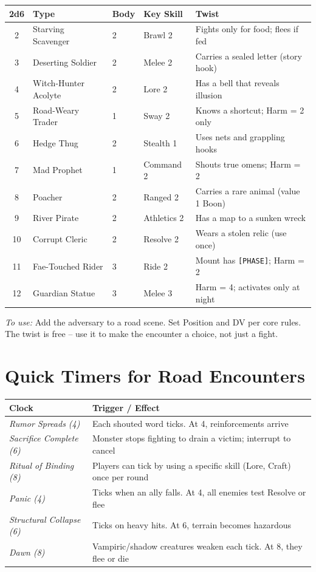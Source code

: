 \bigskip
\begin{tabular}{@{}cllll}
\toprule
2d6 & \textbf{Type} & \textbf{Body} & \textbf{Key Skill} & \textbf{Twist} \\
\midrule
2 & Starving Scavenger & 2 & Brawl 2 & Fights only for food; flees if fed \\
3 & Deserting Soldier & 2 & Melee 2 & Carries a sealed letter (story hook) \\
4 & Witch-Hunter Acolyte & 2 & Lore 2 & Has a bell that reveals illusion \\
5 & Road-Weary Trader & 1 & Sway 2 & Knows a shortcut; Harm = 2 only \\
6 & Hedge Thug & 2 & Stealth 1 & Uses nets and grappling hooks \\
7 & Mad Prophet & 1 & Command 2 & Shouts true omens; Harm = 2 \\
8 & Poacher & 2 & Ranged 2 & Carries a rare animal (value 1 Boon) \\
9 & River Pirate & 2 & Athletics 2 & Has a map to a sunken wreck \\
10 & Corrupt Cleric & 2 & Resolve 2 & Wears a stolen relic (use once) \\
11 & Fae-Touched Rider & 3 & Ride 2 & Mount has \texttt{[PHASE]}; Harm = 2 \\
12 & Guardian Statue & 3 & Melee 3 & Harm = 4; activates only at night \\
\bottomrule
\end{tabular}

\noindent \emph{To use:} Add the adversary to a road scene. Set Position and DV per core rules. The twist is free -- use it to make the encounter a choice, not just a fight.

\section*{Quick Timers for Road Encounters}

\begin{tabular}{@{}ll}
\toprule
\textbf{Clock} & \textbf{Trigger / Effect} \\
\midrule
\textit{Rumor Spreads (4)} & Each shouted word ticks. At 4, reinforcements arrive \\
\textit{Sacrifice Complete (6)} & Monster stops fighting to drain a victim; interrupt to cancel \\
\textit{Ritual of Binding (8)} & Players can tick by using a specific skill (Lore, Craft) once per round \\
\textit{Panic (4)} & Ticks when an ally falls. At 4, all enemies test Resolve or flee \\
\textit{Structural Collapse (6)} & Ticks on heavy hits. At 6, terrain becomes hazardous \\
\textit{Dawn (8)} & Vampiric/shadow creatures weaken each tick. At 8, they flee or die \\
\bottomrule
\end{tabular}

